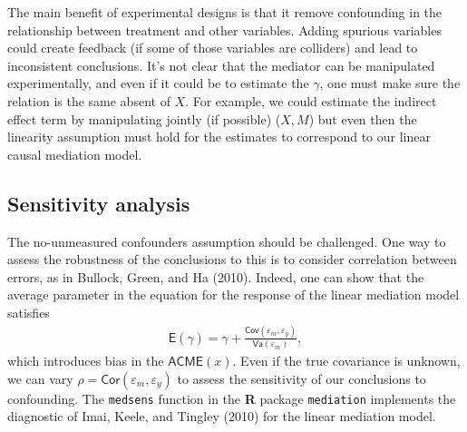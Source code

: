 \documentclass[
  11pt,
  letterpaper,
]{scrbook}
\theoremstyle{definition}
\theoremstyle{definition}
\theoremstyle{remark}
\begin{document}
The main benefit of experimental designs is that it remove confounding
in the relationship between treatment and other variables. Adding
spurious variables could create feedback (if some of those variables are
colliders) and lead to inconsistent conclusions. It's not clear that the
mediator can be manipulated experimentally, and even if it could be to
estimate the \(\gamma\), one must make sure the relation is the same
absent of \(X\). For example, we could estimate the indirect effect term
by manipulating jointly (if possible) (\(X, M\)) but even then the
linearity assumption must hold for the estimates to correspond to our
linear causal mediation model.

\subsection{Sensitivity analysis}\label{sensitivity-analysis}

The no-unmeasured confounders assumption should be challenged. One way
to assess the robustness of the conclusions to this is to consider
correlation between errors, as in Bullock, Green, and Ha (2010). Indeed,
one can show that the average parameter in the equation for the response
of the linear mediation model satisfies \begin{align*}
\mathsf{E}(\widehat{\gamma})= \gamma + \frac{\mathsf{Cov}(\varepsilon_m, \varepsilon_y)}{\mathsf{Va}(\varepsilon_m)},
\end{align*} which introduces bias in the \(\mathsf{ACME}(x)\). Even if
the true covariance is unknown, we can vary
\(\rho=\mathsf{Cor}(\varepsilon_m, \varepsilon_y)\) to assess the
sensitivity of our conclusions to confounding. The \texttt{medsens}
function in the \textbf{R} package \texttt{mediation} implements the
diagnostic of Imai, Keele, and Tingley (2010) for the linear mediation
model.
\end{document}
